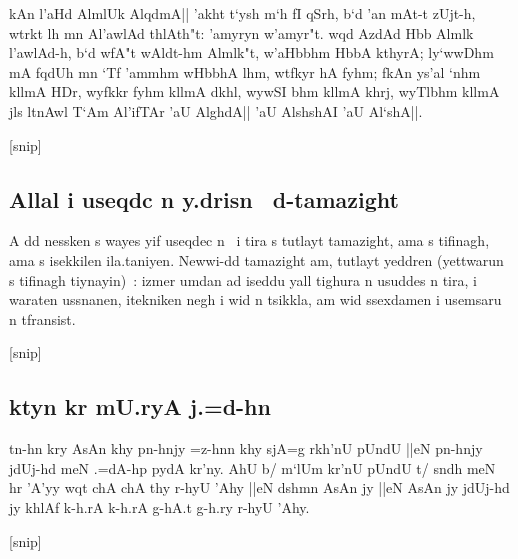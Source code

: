 \documentclass[a4paper,11pt]{article}
\begin{document}
kAn l'aHd AlmlUk AlqdmA|| 'akht t`ysh m`h fI qSrh, b`d 'an mAt-t
zUjt-h, wtrkt lh mn Al'awlAd thlAth"t: 'amyryn w'amyr"t. wqd AzdAd Hbb
Almlk l'awlAd-h, b`d wfA"t wAldt-hm Almlk"t, w'aHbbhm HbbA kthyrA;
ly`wwDhm mA fqdUh mn `Tf 'ammhm wHbbhA lhm, wtfkyr hA fyhm; fkAn ys'al
`nhm kllmA HDr, wyfkkr fyhm kllmA dkhl, wywSI bhm kllmA khrj, wyTlbhm
kllmA jls ltnAwl T`Am Al'ifTAr 'aU AlghdA|| 'aU AlshshAI 'aU Al`shA||.


[snip] 

\popocplist

\pushocplist\ArabicBerberOCP

\subsection{Allal i useqdc n y.drisn \OMEGA\ d-tamazight}

A dd nessken s wayes yif useqdec n \OMEGA\ i tira s tutlayt tamazight,
ama s tifinagh, ama s isekkilen ila.taniyen. Newwi-dd tamazight am,
tutlayt yeddren (yettwarun s tifinagh tiynayin)~: izmer umdan ad
iseddu yall tighura n usuddes n tira, i waraten ussnanen, itekniken
negh i wid n tsikkla, am wid ssexdamen i usemsaru n tfransist.


[snip] 

\popocplist

\pushocplist\SindhiOCP
\subsection{ktyn kr mU.ryA j.=d-hn}

tn-hn kry AsAn khy pn-hnjy =z-hnn khy sjA=g rkh'nU pUndU ||eN pn-hnjy
jdUj-hd meN .=dA-hp pydA kr'ny. AhU b/ m`lUm kr'nU pUndU t/ sndh meN
hr 'A'yy wqt chA chA thy r-hyU 'Ahy ||eN dshmn AsAn jy ||eN AsAn jy
jdUj-hd jy khlAf k-h.rA k-h.rA g-hA.t g-h.ry r-hyU 'Ahy.

[snip] 

\popocplist
\end{document}
